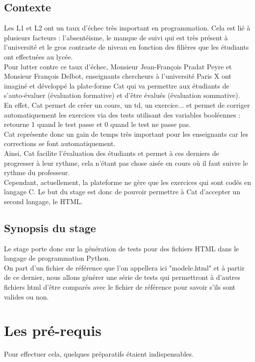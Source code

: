 \documentclass[12pt,twoside]{book}
\begin{document}
\subsection{Contexte}
Les L1 et L2 ont un taux d'échec très important en programmation. Cela est lié à plusieurs facteurs : l'absentéisme, le manque de suivi qui est très présent à l'université et le gros contraste de niveau en fonction des filières que les étudiants ont effectuées au lycée.\\
Pour lutter contre ce taux d'échec, Monsieur Jean-François Pradat Peyre et Monsieur François Delbot, enseignants chercheurs à l'université Paris X ont imaginé et développé la plate-forme Cat qui va permettre aux étudiants de s'auto-évaluer (évaluation formative) et d'être évalués (évaluation sommative).\\
En effet, Cat permet de créer un cours, un td, un exercice... et
permet de corriger automatiquement les exercices via des tests utilisant des variables booléennes : retourne 1 quand le test passe et 0 quand le test ne passe pas.\\
Cat représente donc un gain de temps très important pour les enseignants car les corrections se font automatiquement.\\
Ainsi, Cat facilite l'évaluation des étudiants et permet à ces derniers de progresser à leur rythme, cela n'étant pas chose aisée en cours où il faut suivre le rythme du professeur.\\
Cependant, actuellement, la plateforme ne gère que les exercices qui sont codés en langage C. Le but du stage est donc de pouvoir permettre à Cat d'accepter un second langage, le HTML.\\
\subsection{Synopsis du stage}
Le stage porte donc sur la génération de tests pour des fichiers HTML dans le langage de programmation Python.\\On part d'un fichier de référence que l'on appellera ici "modele.html" et à partir de ce dernier, nous allons générer une série de tests qui permettront à d'autres fichiers html d'être comparés avec le fichier de référence pour savoir s'ils sont valides ou non.

\section {Les pré-requis}
Pour effectuer cela, quelques préparatifs étaient indispensables.
\end{document}
